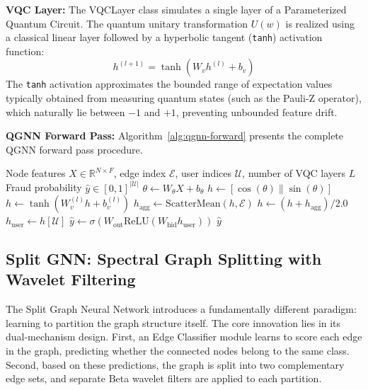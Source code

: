 \textbf{VQC Layer:} The VQCLayer class simulates a single layer of a Parameterized Quantum Circuit. The quantum unitary transformation $U(w)$ is realized using a classical linear layer followed by a hyperbolic tangent (\texttt{tanh}) activation function:
\begin{equation}
h^{(l+1)} = \tanh(W_v h^{(l)} + b_v)
\end{equation}
The \texttt{tanh} activation approximates the bounded range of expectation values typically obtained from measuring quantum states (such as the Pauli-Z operator), which naturally lie between $-1$ and $+1$, preventing unbounded feature drift.

\textbf{QGNN Forward Pass:} Algorithm~\ref{alg:qgnn-forward} presents the complete QGNN forward pass procedure.

\begin{algorithm}[H]
\caption{QGNN Forward Pass}
\label{alg:qgnn-forward}
\begin{algorithmic}[1]
\REQUIRE Node features $X \in \mathbb{R}^{N \times F}$, edge index $\mathcal{E}$, user indices $\mathcal{U}$, number of VQC layers $L$
\ENSURE Fraud probability $\hat{y} \in [0,1]^{| \mathcal{U} |}$
\STATE $\theta \leftarrow W_\theta X + b_\theta$ 
\STATE $h \leftarrow [\cos(\theta) \| \sin(\theta)]$ 
    \STATE $h \leftarrow \tanh(W_v^{(l)} h + b_v^{(l)})$ 
\ENDFOR
\STATE $h_{\text{agg}} \leftarrow \text{ScatterMean}(h, \mathcal{E})$ 
\STATE $h \leftarrow (h + h_{\text{agg}}) / 2.0$ 
\STATE $h_{\text{user}} \leftarrow h[\mathcal{U}]$ 
\STATE $\hat{y} \leftarrow \sigma(W_{\text{out}} \text{ReLU}(W_{\text{hid}} h_{\text{user}}))$ 
\RETURN $\hat{y}$
\end{algorithmic}
\end{algorithm}

\subsection{Split GNN: Spectral Graph Splitting with Wavelet Filtering}

The Split Graph Neural Network introduces a fundamentally different paradigm: learning to partition the graph structure itself. The core innovation lies in its dual-mechanism design. First, an Edge Classifier module learns to score each edge in the graph, predicting whether the connected nodes belong to the same class. Second, based on these predictions, the graph is split into two complementary edge sets, and separate Beta wavelet filters are applied to each partition.

